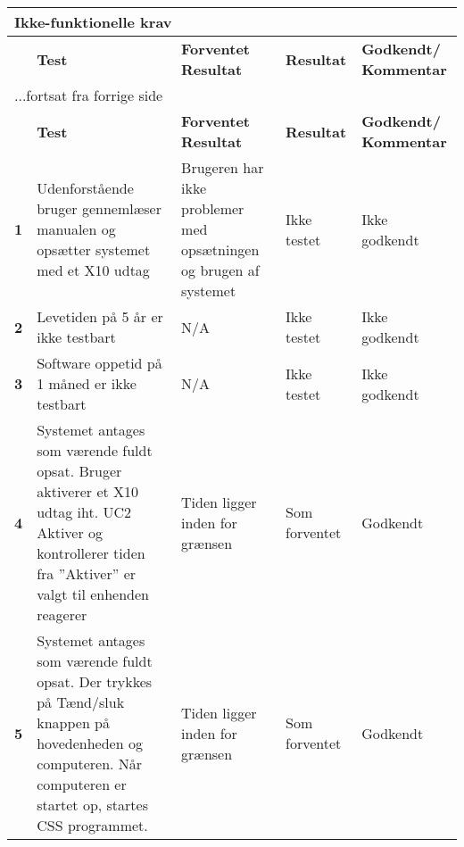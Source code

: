 
\begin{center}
\begin{longtable}{|p{}|p{}|p{}|p{}|p{}|} %
\hline
\multicolumn{5}{|l|}{\textbf{Ikke-funktionelle krav}} \\ \hline
\multicolumn{1}{|c|}{} &
\textbf{Test} &
\textbf{Forventet \newline Resultat} &
\textbf{Resultat} &
\textbf{Godkendt/ \newline Kommentar} \\ \hline 
\endfirsthead

\multicolumn{5}{l}{...fortsat fra forrige side} \\ \hline 
\multicolumn{1}{|c|}{} &
\textbf{Test} &
\textbf{Forventet \newline Resultat} &
\textbf{Resultat} &
\textbf{Godkendt/ \newline Kommentar} \\ \hline 
\endhead


\textbf{1} &
Udenforstående bruger gennemlæser manualen og opsætter systemet med et X10 udtag &
Brugeren har ikke problemer med opsætningen og brugen af systemet 
&Ikke \newline testet
&Ikke \newline godkendt
  \\\hline

\textbf{2} &
Levetiden på 5 år er ikke testbart &
N/A 
&Ikke \newline testet
&Ikke \newline godkendt
 \\\hline

\textbf{3} &
Software oppetid på 1 måned er ikke testbart &
N/A 
&Ikke \newline testet
&Ikke \newline godkendt
 \\\hline

\textbf{4} &
Systemet antages som værende fuldt opsat.\newline
Bruger aktiverer et X10 udtag iht. UC2 Aktiver og kontrollerer tiden fra ''Aktiver'' er valgt til enhenden reagerer&
Tiden ligger inden for grænsen
&Som \newline forventet
&Godkendt
 \\\hline

\textbf{5} &
Systemet antages som værende fuldt opsat.\newline
Der trykkes på Tænd/sluk knappen på hovedenheden og computeren. Når computeren er startet op, startes CSS programmet. &
Tiden ligger inden for grænsen
&Som \newline forventet
&Godkendt
 \\\hline


\end{longtable}
\end{center}
